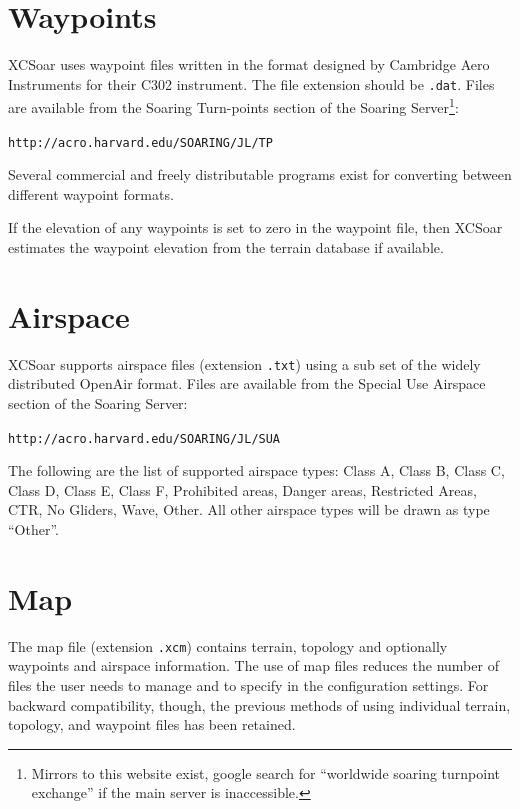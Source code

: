 \documentclass[a4paper,12pt]{refrep}
\begin{document}
\section{Waypoints}

XCSoar uses waypoint files written in the format designed by Cambridge
Aero Instruments for their C302 instrument.  The file extension should
be \verb|.dat|.
Files are available from the Soaring Turn-points section of the
Soaring Server\footnote{Mirrors to this website exist, google search
for ``worldwide soaring turnpoint exchange'' if the main server is
inaccessible.}:

\verb|http://acro.harvard.edu/SOARING/JL/TP|

Several commercial and freely distributable programs exist for
converting between different waypoint formats.

If the elevation of any waypoints is set to zero in the waypoint file,
then XCSoar estimates the waypoint elevation from the terrain database
if available.

\section{Airspace}

XCSoar supports airspace files (extension \verb|.txt|) using a sub set
of the widely distributed OpenAir format. Files are available from the
Special Use Airspace section of the Soaring Server:

\verb|http://acro.harvard.edu/SOARING/JL/SUA|


The following are the list of supported airspace types: Class A, Class
B, Class C, Class D, Class E, Class F, Prohibited areas, Danger areas,
Restricted Areas, CTR, No Gliders, Wave, Other.  All other airspace
types will be drawn as type ``Other''.

\section{Map}\label{sec:map}

The map file (extension \verb|.xcm|) contains terrain, topology and
optionally waypoints and airspace information.  The use of map files
reduces the number of files the user needs to manage and to specify in
the configuration settings.  For backward compatibility, though, the
previous methods of using individual terrain, topology, and waypoint
files has been retained.
\end{document}

